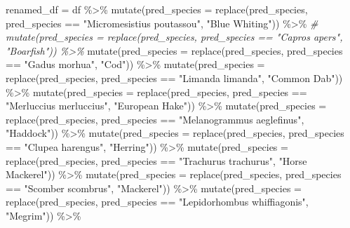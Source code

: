 \documentclass[
]{article}
\newenvironment{Shaded}{\begin{snugshade}}{\end{snugshade}}
\newcommand{\AttributeTok}[1]{\textcolor[rgb]{0.77,0.63,0.00}{#1}}
\newcommand{\CommentTok}[1]{\textcolor[rgb]{0.56,0.35,0.01}{\textit{#1}}}
\newcommand{\FunctionTok}[1]{\textcolor[rgb]{0.00,0.00,0.00}{#1}}
\newcommand{\NormalTok}[1]{#1}
\newcommand{\OtherTok}[1]{\textcolor[rgb]{0.56,0.35,0.01}{#1}}
\newcommand{\SpecialCharTok}[1]{\textcolor[rgb]{0.00,0.00,0.00}{#1}}
\newcommand{\StringTok}[1]{\textcolor[rgb]{0.31,0.60,0.02}{#1}}
\begin{document}
\begin{Shaded}
\begin{Highlighting}[]
\NormalTok{renamed\_df }\OtherTok{=}\NormalTok{ df }\SpecialCharTok{\%\textgreater{}\%} 
  \FunctionTok{mutate}\NormalTok{(}\AttributeTok{pred\_species =} \FunctionTok{replace}\NormalTok{(pred\_species, }
\NormalTok{                                pred\_species }\SpecialCharTok{==} \StringTok{"Micromesistius poutassou"}\NormalTok{, }\StringTok{"Blue Whiting"}\NormalTok{)) }\SpecialCharTok{\%\textgreater{}\%}
\CommentTok{\#  mutate(pred\_species = replace(pred\_species, pred\_species == "Capros apers", "Boarfish")) \%\textgreater{}\%}
  \FunctionTok{mutate}\NormalTok{(}\AttributeTok{pred\_species =} \FunctionTok{replace}\NormalTok{(pred\_species, pred\_species }\SpecialCharTok{==} \StringTok{"Gadus morhua"}\NormalTok{, }\StringTok{"Cod"}\NormalTok{)) }\SpecialCharTok{\%\textgreater{}\%} 
  \FunctionTok{mutate}\NormalTok{(}\AttributeTok{pred\_species =} \FunctionTok{replace}\NormalTok{(pred\_species, pred\_species }\SpecialCharTok{==} \StringTok{"Limanda limanda"}\NormalTok{, }\StringTok{"Common Dab"}\NormalTok{)) }\SpecialCharTok{\%\textgreater{}\%}
  \FunctionTok{mutate}\NormalTok{(}\AttributeTok{pred\_species =} \FunctionTok{replace}\NormalTok{(pred\_species, }
\NormalTok{                                pred\_species }\SpecialCharTok{==} \StringTok{"Merluccius merluccius"}\NormalTok{, }\StringTok{"European Hake"}\NormalTok{)) }\SpecialCharTok{\%\textgreater{}\%}  
  \FunctionTok{mutate}\NormalTok{(}\AttributeTok{pred\_species =} \FunctionTok{replace}\NormalTok{(pred\_species, pred\_species }\SpecialCharTok{==} \StringTok{"Melanogrammus aeglefinus"}\NormalTok{, }\StringTok{"Haddock"}\NormalTok{)) }\SpecialCharTok{\%\textgreater{}\%}  
  \FunctionTok{mutate}\NormalTok{(}\AttributeTok{pred\_species =} \FunctionTok{replace}\NormalTok{(pred\_species, pred\_species }\SpecialCharTok{==} \StringTok{"Clupea harengus"}\NormalTok{, }\StringTok{"Herring"}\NormalTok{)) }\SpecialCharTok{\%\textgreater{}\%} 
  \FunctionTok{mutate}\NormalTok{(}\AttributeTok{pred\_species =} \FunctionTok{replace}\NormalTok{(pred\_species, pred\_species }\SpecialCharTok{==} \StringTok{"Trachurus trachurus"}\NormalTok{, }\StringTok{"Horse Mackerel"}\NormalTok{)) }\SpecialCharTok{\%\textgreater{}\%}  
  \FunctionTok{mutate}\NormalTok{(}\AttributeTok{pred\_species =} \FunctionTok{replace}\NormalTok{(pred\_species, pred\_species }\SpecialCharTok{==} \StringTok{"Scomber scombrus"}\NormalTok{, }\StringTok{"Mackerel"}\NormalTok{)) }\SpecialCharTok{\%\textgreater{}\%}
  \FunctionTok{mutate}\NormalTok{(}\AttributeTok{pred\_species =} \FunctionTok{replace}\NormalTok{(pred\_species, pred\_species }\SpecialCharTok{==} \StringTok{"Lepidorhombus whiffiagonis"}\NormalTok{, }\StringTok{"Megrim"}\NormalTok{)) }\SpecialCharTok{\%\textgreater{}\%}

\end{Highlighting}
\end{Shaded}
\end{document}
